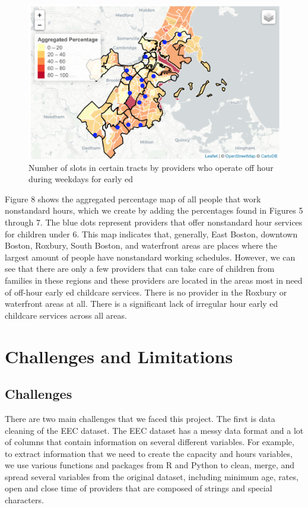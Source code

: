 \documentclass[10pt,letterpaper]{article}
\begin{document}
\begin{figure}

{\centering \includegraphics[width=0.8\linewidth]{aggregatehourdemand} 

}

\caption{Number of slots in certain tracts by providers who operate off hour during weekdays for early ed}\label{fig:unnamed-chunk-14}
\end{figure}

Figure 8 shows the aggregated percentage map of all people that work
nonstandard hours, which we create by adding the percentages found in
Figures 5 through 7. The blue dots represent providers that offer
nonstandard hour services for children under 6. This map indicates that,
generally, East Boston, downtown Boston, Roxbury, South Boston, and
waterfront areas are places where the largest amount of people have
nonstandard working schedules. However, we can see that there are only a
few providers that can take care of children from families in these
regions and these providers are located in the areas most in need of
off-hour early ed childcare services. There is no provider in the
Roxbury or waterfront areas at all. There is a significant lack of
irregular hour early ed childcare services across all areas.

\section{Challenges and Limitations}\label{challenges-and-limitations}

\subsection{Challenges}\label{challenges}

There are two main challenges that we faced this project. The first is
data cleaning of the EEC dataset. The EEC dataset has a messy data
format and a lot of columns that contain information on several
different variables. For example, to extract information that we need to
create the capacity and hours variables, we use various functions and
packages from R and Python to clean, merge, and spread several variables
from the original dataset, including minimum age, rates, open and close
time of providers that are composed of strings and special characters.
\end{document}
